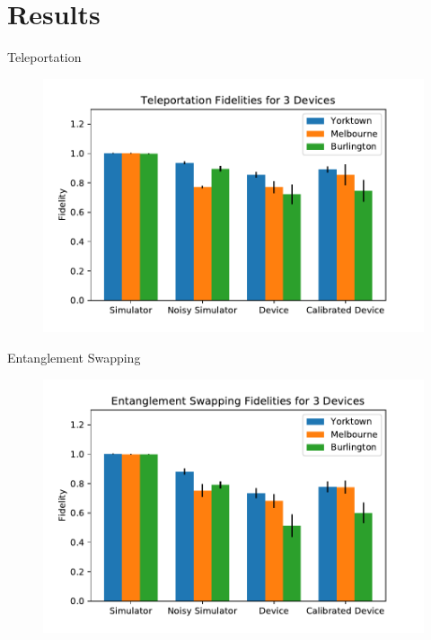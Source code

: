 \section{Results}

\begin{frame}{Teleportation}
\begin{figure} 
	\includegraphics[width=1\textwidth]{images/results/teleport_histogram.pdf}
\end{figure}
\end{frame}

\begin{frame}{Entanglement Swapping}
\begin{figure} 
	\includegraphics[width=1\textwidth]{images/results/swap_histogram.pdf}
\end{figure}
\end{frame}

